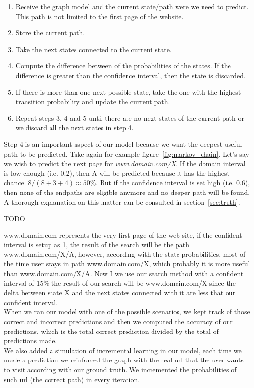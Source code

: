 \begin{enumerate}
	\item Receive the graph model and the current state/path were we need to predict. This path is not limited to the first page of the website.
	\item Store the current path.
	\item Take the next states connected to the current state.
	\item Compute the difference between of the probabilities of the states. If the difference is greater than the confidence interval, then the state is discarded.
	\item If there is more than one next possible state, take the one with the highest transition probability and update the current path.
	\item Repeat steps 3, 4 and 5 until there are no next states of the current path or we discard all the next states in step 4.
\end{enumerate}

Step 4 is an important aspect of our model because we want the deepest useful path to be predicted. Take again for example figure~\ref{fig:markov_chain}. Let's say we wish to predict the next page for \textit{www.domain.com/X}. If the domain interval is low enough (i.e. 0.2), then A will be predicted because it has the highest chance: $8/(8+3+4) \approx 50\%$. But if the confidence interval is set high (i.e. 0.6), then none of the endpaths are eligible anymore and no deeper path will be found. A thorough explanation on this matter can be consulted in section~\ref{sec:truth}.

TODO

www.domain.com represents the very first page of the web site, if the confident interval is setup as 1, the result of the search will be the path www.domain.com/X/A, however, according with the state probabilities, most of the time user stays in path www.domain.com/X, which probably it is more useful than www.domain.com/X/A. Now I we use our search method with a confident interval of 15\% the result of our search will be www.domain.com/X since the delta between state X and the next states connected with it are less that our confident interval.
\\[2ex]
When we ran our model with one of the possible scenarios, we kept track of those correct and incorrect predictions and then we computed the accuracy of our predictions, which is the total correct prediction divided by the total of predictions made. 
\\[2ex]
We also added a simulation of incremental learning in our model, each time we made a prediction we reinforced the graph with the real url that the user wants to visit according with our ground truth. We incremented the probabilities of such url (the correct path) in every iteration.

